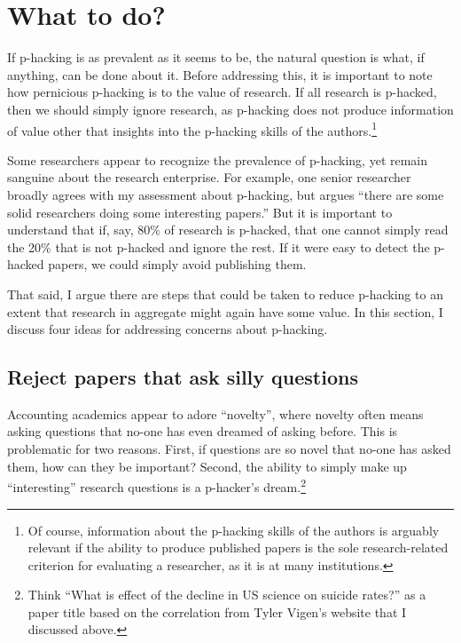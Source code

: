 \documentclass[
  letterpaper,
  DIV=11,
  numbers=noendperiod]{scrartcl}
\begin{document}
\hypertarget{what-to-do}{%
\section{What to do?}\label{what-to-do}}

If p-hacking is as prevalent as it seems to be, the natural question is
what, if anything, can be done about it. Before addressing this, it is
important to note how pernicious p-hacking is to the value of research.
If all research is p-hacked, then we should simply ignore research, as
p-hacking does not produce information of value other that insights into
the p-hacking skills of the authors.\footnote{Of course, information
  about the p-hacking skills of the authors is arguably relevant if the
  ability to produce published papers is the sole research-related
  criterion for evaluating a researcher, as it is at many institutions.}

Some researchers appear to recognize the prevalence of p-hacking, yet
remain sanguine about the research enterprise. For example, one senior
researcher broadly agrees with my assessment about p-hacking, but argues
``there are some solid researchers doing some interesting papers.'' But
it is important to understand that if, say, 80\% of research is
p-hacked, that one cannot simply read the 20\% that is not p-hacked and
ignore the rest. If it were easy to detect the p-hacked papers, we could
simply avoid publishing them.

That said, I argue there are steps that could be taken to reduce
p-hacking to an extent that research in aggregate might again have some
value. In this section, I discuss four ideas for addressing concerns
about p-hacking.

\hypertarget{reject-papers-that-ask-silly-questions}{%
\subsection{Reject papers that ask silly
questions}\label{reject-papers-that-ask-silly-questions}}

Accounting academics appear to adore ``novelty'', where novelty often
means asking questions that no-one has even dreamed of asking before.
This is problematic for two reasons. First, if questions are so novel
that no-one has asked them, how can they be important? Second, the
ability to simply make up ``interesting'' research questions is a
p-hacker's dream.\footnote{Think ``What is effect of the decline in US
  science on suicide rates?'' as a paper title based on the correlation
  from Tyler Vigen's website that I discussed above.}
\end{document}
